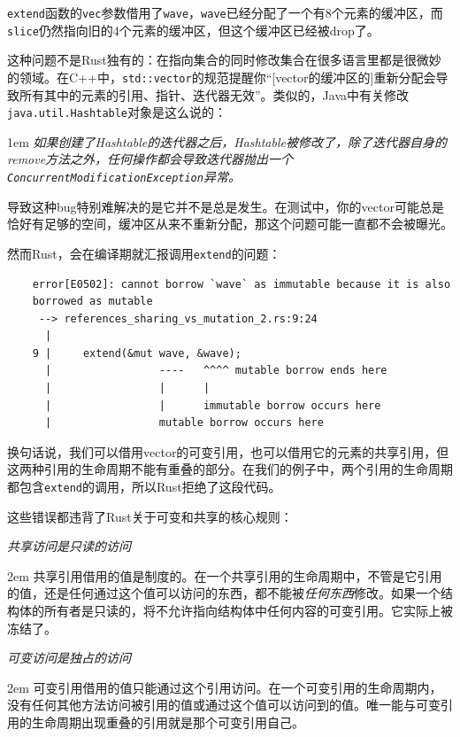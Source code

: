 \texttt{extend}函数的\texttt{vec}参数借用了\texttt{wave}，\texttt{wave}已经分配了一个有8个元素的缓冲区，而\texttt{slice}仍然指向旧的4个元素的缓冲区，但这个缓冲区已经被drop了。

这种问题不是Rust独有的：在指向集合的同时修改集合在很多语言里都是很微妙的领域。在C++中，\texttt{std::vector}的规范提醒你“[vector的缓冲区的]重新分配会导致所有其中的元素的引用、指针、迭代器无效”。类似的，Java中有关修改\texttt{java.util.Hashtable}对象是这么说的：

\hangindent 1em
\noindent
\emph{如果创建了Hashtable的迭代器之后，Hashtable被修改了，除了迭代器自身的remove方法之外，任何操作都会导致迭代器抛出一个\texttt{ConcurrentModificationException}异常。}

导致这种bug特别难解决的是它并不是总是发生。在测试中，你的vector可能总是恰好有足够的空间，缓冲区从来不重新分配，那这个问题可能一直都不会被曝光。

然而Rust，会在编译期就汇报调用\texttt{extend}的问题：
\begin{verbatim}
    error[E0502]: cannot borrow `wave` as immutable because it is also
    borrowed as mutable
     --> references_sharing_vs_mutation_2.rs:9:24
      |
    9 |     extend(&mut wave, &wave);
      |                 ----   ^^^^ mutable borrow ends here
      |                 |      |
      |                 |      immutable borrow occurs here
      |                 mutable borrow occurs here
\end{verbatim}

换句话说，我们可以借用vector的可变引用，也可以借用它的元素的共享引用，但这两种引用的生命周期不能有重叠的部分。在我们的例子中，两个引用的生命周期都包含\texttt{extend}的调用，所以Rust拒绝了这段代码。

这些错误都违背了Rust关于可变和共享的核心规则：

\begin{flushleft}
    \emph{共享访问是只读的访问}
\end{flushleft}

\hangindent 2em
\noindent
共享引用借用的值是制度的。在一个共享引用的生命周期中，不管是它引用的值，还是任何通过这个值可以访问的东西，都不能被\emph{任何东西}修改。如果一个结构体的所有者是只读的，将不允许指向结构体中任何内容的可变引用。它实际上被冻结了。

\begin{flushleft}
    \emph{可变访问是独占的访问}
\end{flushleft}

\hangindent 2em
\noindent
可变引用借用的值只能通过这个引用访问。在一个可变引用的生命周期内，没有任何其他方法访问被引用的值或通过这个值可以访问到的值。唯一能与可变引用的生命周期出现重叠的引用就是那个可变引用自己。

